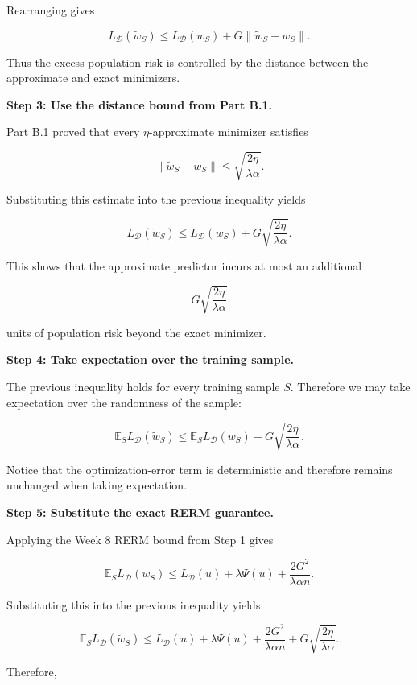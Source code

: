 \documentclass[11pt]{article}
\newcommand{\E}{\mathbb{E}}
\begin{document}
\begin{enumerate}
\begin{solutionbox}
Rearranging gives

\[
L_{\mathcal D}(\widetilde w_S)
\le
L_{\mathcal D}(w_S)
+
G
\|
\widetilde w_S-w_S
\|.
\]

Thus the excess population risk is controlled by the distance between the approximate and exact minimizers.

\medskip

\textbf{Step 3: Use the distance bound from Part B.1.}

Part B.1 proved that every \(\eta\)-approximate minimizer satisfies

\[
\|
\widetilde w_S-w_S
\|
\le
\sqrt{
\frac{2\eta}
     {\lambda\alpha}
}.
\]

Substituting this estimate into the previous inequality yields

\[
L_{\mathcal D}(\widetilde w_S)
\le
L_{\mathcal D}(w_S)
+
G
\sqrt{
\frac{2\eta}
     {\lambda\alpha}
}.
\]

This shows that the approximate predictor incurs at most an additional

\[
G
\sqrt{
\frac{2\eta}
     {\lambda\alpha}
}
\]

units of population risk beyond the exact minimizer.

\medskip

\textbf{Step 4: Take expectation over the training sample.}

The previous inequality holds for every training sample \(S\). Therefore we may take expectation over the randomness of the sample:

\[
\E_S
L_{\mathcal D}(\widetilde w_S)
\le
\E_S
L_{\mathcal D}(w_S)
+
G
\sqrt{
\frac{2\eta}
     {\lambda\alpha}
}.
\]

Notice that the optimization-error term is deterministic and therefore remains unchanged when taking expectation.

\medskip

\textbf{Step 5: Substitute the exact RERM guarantee.}

Applying the Week 8 RERM bound from Step 1 gives

\[
\E_S
L_{\mathcal D}(w_S)
\le
L_{\mathcal D}(u)
+
\lambda\Psi(u)
+
\frac{2G^2}{\lambda\alpha n}.
\]

Substituting this into the previous inequality yields

\[
\E_S
L_{\mathcal D}(\widetilde w_S)
\le
L_{\mathcal D}(u)
+
\lambda\Psi(u)
+
\frac{2G^2}{\lambda\alpha n}
+
G
\sqrt{
\frac{2\eta}
     {\lambda\alpha}
}.
\]

Therefore,


\end{solutionbox}
\end{enumerate}
\end{document}
